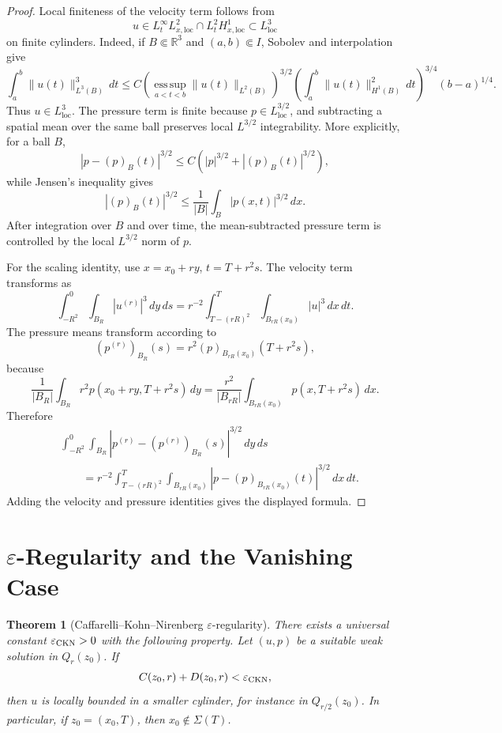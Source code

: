 \documentclass[11pt]{amsart}
\theoremstyle{plain}
\newtheorem{theorem}{Theorem}[section]
\theoremstyle{definition}
\theoremstyle{remark}
\numberwithin{equation}{section}
\begin{document}
\begin{proof}
Local finiteness of the velocity term follows from
\[
  u\in L^\infty_tL^2_{x,\mathrm{loc}}
  \cap L^2_tH^1_{x,\mathrm{loc}}
  \subset L^3_{\mathrm{loc}}
\]
on finite cylinders.  Indeed, if \(B\Subset\mathbb R^3\) and
\((a,b)\Subset I\), Sobolev and interpolation give
\[
  \int_a^b \|u(t)\|_{L^3(B)}^3\,dt
  \le
  C
  \left(\operatorname*{ess\,sup}_{a<t<b}\|u(t)\|_{L^2(B)}\right)^{3/2}
  \left(\int_a^b \|u(t)\|_{H^1(B)}^2\,dt\right)^{3/4}
  (b-a)^{1/4}.
\]
Thus \(u\in L^3_{\mathrm{loc}}\).  The pressure term is finite because
\(p\in L^{3/2}_{\mathrm{loc}}\), and subtracting a spatial mean over the same
ball preserves local \(L^{3/2}\) integrability.  More explicitly, for a ball
\(B\),
\[
  |p-(p)_B(t)|^{3/2}\le C\left(|p|^{3/2}+|(p)_B(t)|^{3/2}\right),
\]
while Jensen's inequality gives
\[
  |(p)_B(t)|^{3/2}
  \le \frac1{|B|}\int_B |p(x,t)|^{3/2}\,dx.
\]
After integration over \(B\) and over time, the mean-subtracted pressure term is
controlled by the local \(L^{3/2}\) norm of \(p\).

For the scaling identity, use \(x=x_0+ry\), \(t=T+r^2s\).  The velocity term
transforms as
\[
  \int_{-R^2}^{0}\int_{B_R}|u^{(r)}|^3\,dy\,ds
  =r^{-2}\int_{T-(rR)^2}^{T}\int_{B_{rR}(x_0)}|u|^3\,dx\,dt.
\]
The pressure means transform according to
\[
  (p^{(r)})_{B_R}(s)=r^2(p)_{B_{rR}(x_0)}(T+r^2s),
\]
because
\[
  \frac1{|B_R|}\int_{B_R} r^2p(x_0+ry,T+r^2s)\,dy
  =
  \frac{r^2}{|B_{rR}|}\int_{B_{rR}(x_0)}p(x,T+r^2s)\,dx .
\]
Therefore
\[
\begin{aligned}
&\int_{-R^2}^{0}\int_{B_R}
|p^{(r)}-(p^{(r)})_{B_R}(s)|^{3/2}\,dy\,ds \\
&\qquad =
r^{-2}\int_{T-(rR)^2}^{T}\int_{B_{rR}(x_0)}
|p-(p)_{B_{rR}(x_0)}(t)|^{3/2}\,dx\,dt .
\end{aligned}
\]
Adding the velocity and pressure identities gives the displayed formula.
\end{proof}

\section{\texorpdfstring{\(\varepsilon\)-Regularity}{Epsilon-Regularity} and the Vanishing Case}

\begin{theorem}[Caffarelli--Kohn--Nirenberg \(\varepsilon\)-regularity]
\label{p0:thm:ckn}
There exists a universal constant \(\varepsilon_{\rm CKN}>0\) with the
following property.  Let \((u,p)\) be a suitable weak solution in \(Q_r(z_0)\).
If
\[
  C(z_0,r)+D(z_0,r)<\varepsilon_{\rm CKN},
\]
then \(u\) is locally bounded in a smaller cylinder, for instance in
\(Q_{r/2}(z_0)\).  In particular, if \(z_0=(x_0,T)\), then
\(x_0\notin\Sigma(T)\).
\end{theorem}
\end{document}

